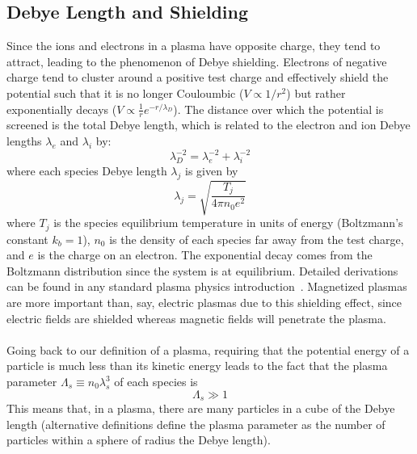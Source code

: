 \subsection{Debye Length and Shielding} \label{ssec:debye}
Since the ions and electrons in a plasma have opposite charge, they tend to attract, leading to the phenomenon of Debye shielding. Electrons of negative charge tend to cluster around a positive test charge and effectively shield the potential such that it is no longer Couloumbic ($V\propto1/r^2$) but rather exponentially decays ($V\propto\frac1r e^{-r/\lambda_D}$). The distance over which the potential is screened is the total Debye length, which is related to the electron and ion Debye lengths $\lambda_e$ and $\lambda_i$ by:
\begin{equation}
  \lambda_D^{-2}=\lambda_e^{-2}+\lambda_i^{-2} \label{eq:debye}
\end{equation}
where each species Debye length $\lambda_j$ is given by
\begin{equation}
  \lambda_j=\sqrt{\frac{T_j}{4\pi n_0 e^2}}
\end{equation}
where $T_j$ is the species equilibrium temperature in units of energy (Boltzmann's constant $k_b=1$), $n_0$ is the density of each species far away from the test charge, and $e$ is the charge on an electron. The exponential decay comes from the Boltzmann distribution since the system is at equilibrium. Detailed derivations can be found in any standard plasma physics introduction~\cite{Nicholson1983, Hazeltine2004, GurnettBhatt}. Magnetized plasmas are more important than, say, electric plasmas due to this shielding effect, since electric fields are shielded whereas magnetic fields will penetrate the plasma.\\
\\
Going back to our definition of a plasma, requiring that the potential energy of a particle is much less than its kinetic energy leads to the fact that the plasma parameter $\Lambda_s\equiv n_0\lambda_s^3$ of each species is
\begin{equation}
  \Lambda_s\gg1
\end{equation}
This means that, in a plasma, there are many particles in a cube of the Debye length (alternative definitions define the plasma parameter as the number of particles within a sphere of radius the Debye length). 

